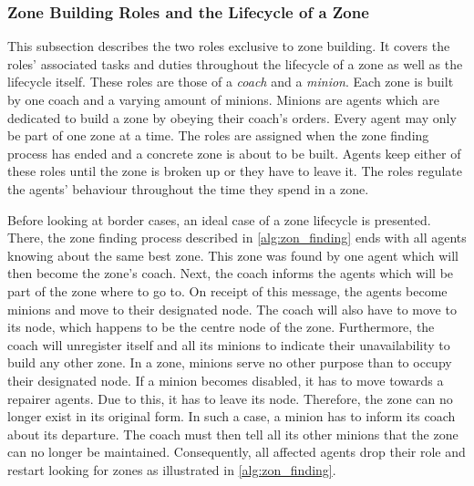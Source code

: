 \subsubsection{Zone Building Roles and the Lifecycle of a Zone}\label{alg:zon_roles}
This subsection describes the two roles exclusive to zone building. It covers the roles' associated tasks and duties throughout the lifecycle of a zone as well as the lifecycle itself. These roles are those of a \emph{coach} and a \emph{minion}. Each zone is built by one coach and a varying amount of minions. Minions are agents which are dedicated to build a zone by obeying their coach's orders. Every agent may only be part of one zone at a time. %
The roles are assigned when the zone finding process has ended and a concrete zone is about to be built. Agents keep either of these roles until the zone is broken up or they have to leave it. The roles regulate the agents' behaviour throughout the time they spend in a zone.

Before looking at border cases, an ideal case of a zone lifecycle is presented. There, the zone finding process described in \autoref{alg:zon_finding} ends with all agents knowing about the same best zone. This zone was found by one agent which will then become the zone's coach. Next, the coach informs the agents which will be part of the zone where to go to. On receipt of this message, the agents become minions and move to their designated node. The coach will also have to move to its node, which happens to be the centre node of the zone. Furthermore, the coach will unregister itself and all its minions to indicate their unavailability to build any other zone.
In a zone, minions serve no other purpose than to occupy their designated node. If a minion becomes disabled, it has to move towards a repairer agents. Due to this, it has to leave its node. Therefore, the zone can no longer exist in its original form. In such a case, a minion has to inform its coach about its departure. The coach must then tell all its other minions that the zone can no longer be maintained. Consequently, all affected agents drop their role and restart looking for zones as illustrated in \autoref{alg:zon_finding}.


